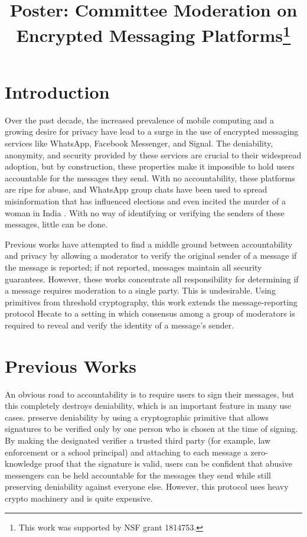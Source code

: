 \documentclass[conference]{IEEEtran}
\title{Poster: Committee Moderation on Encrypted Messaging Platforms\thanks{This work was supported by NSF grant 1814753.}}
\author{
    \IEEEauthorblockN{Alistair Pattison}
    \IEEEauthorblockA{
        \textit{University of Minnesota and Carleton College} \\
        pattisona@carleton.edu
    } \and
    \IEEEauthorblockN{Nicholas Hopper}
    \IEEEauthorblockA{
        \textit{University of Minnesota} \\
        hoppernj@umn.edu
    }
}
\begin{document}
\maketitle


\section{Introduction}

Over the past decade, the increased prevalence of mobile computing and a growing desire for privacy have lead to a surge in the use of encrypted messaging services like WhatsApp, Facebook Messenger, and Signal.
The deniability, anonymity, and security provided by these services are crucial to their widespread adoption, but by construction, these properties make it impossible to hold users accountable for the messages they send.
With no accountability, these platforms are ripe for abuse, and WhatsApp group chats have been used to spread misinformation that has influenced elections \cite{pbs-brazil-whatsapp,oxford-computational-propoganda-report} and even incited the murder of a woman in India \cite{nytimes-whatsapp-india-murder}.
With no way of identifying or verifying the senders of these messages, little can be done.

Previous works \cite{hecate, tglmr} have attempted to find a middle ground between accountability and privacy by allowing a moderator to verify the original sender of a message if the message is reported; if not reported, messages maintain all security guarantees.
However, these works concentrate all responsibility  for determining if a message requires moderation to a single party.
This is undesirable.
Using primitives from threshold cryptography, this work extends the message-reporting protocol Hecate \cite{hecate} to a setting in which consensus among a group of moderators is required to reveal and verify the identity of a message's sender.

\section{Previous Works}

An obvious road to accountability is to require users to sign their messages, but this completely destroys deniability, which is an important feature in many use cases.
\textcite{tglmr} preserve deniability by using a cryptographic primitive that allows signatures to be verified only by one person who is chosen at the time of signing.
By making the designated verifier a trusted third party (for example, law enforcement or a school principal) and attaching to each message a zero-knowledge proof that the signature is valid, users can be confident that abusive messengers can be held accountable for the messages they send while still preserving deniability against everyone else.
However, this protocol uses heavy crypto machinery and is quite expensive.
\end{document}

